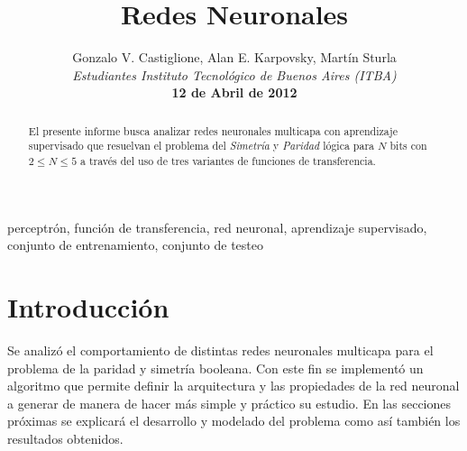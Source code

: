 \documentclass[%
    final,
    reprint,
    notitlepage,
    narroweqnarray,
    inline,
    twoside,
    invited
    ]{ieee}
\begin{document}
\title[Redes Neuronales]{%
       Redes Neuronales}

\author[Castiglione, Karpovsky, Sturla]{Gonzalo V. Castiglione, Alan E. Karpovsky, Martín Sturla\\\textit{Estudiantes 
       Instituto Tecnológico de Buenos Aires (ITBA)}\\
\textbf{12 de Abril de 2012}
}


\lognumber{}
\pubitemident{}


\maketitle               

\begin{abstract} 
El presente informe busca analizar  redes neuronales multicapa
con aprendizaje supervisado que resuelvan el problema del \textit{Simetría} y \textit{Paridad} lógica para $N$ bits 
con $2 \le N \le 5$ a través del uso de tres variantes de funciones de transferencia.

\end{abstract}

\begin{keywords}
perceptrón, función de transferencia, red neuronal, aprendizaje supervisado, conjunto de entrenamiento, conjunto de testeo
\end{keywords}

\section{Introducción}

\par Se analizó el comportamiento de distintas redes neuronales multicapa para el problema de la paridad y simetría booleana. Con este fin se implementó un algoritmo que permite definir la arquitectura y las propiedades de la red neuronal a generar de manera de hacer más simple y práctico su estudio. En las secciones próximas se explicará el desarrollo y modelado del problema como así también los resultados obtenidos.
\end{document}
